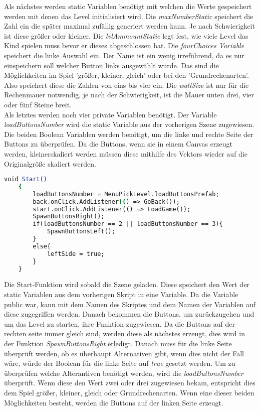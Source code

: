 Als nächstes werden static Variablen benötigt mit welchen die Werte gespeichert werden mit denen das Level initialisiert wird. Die \textit{maxNumberStatic} speichert die Zahl ein die später maximal zufällig generiert werden kann. Je nach Schwierigkeit ist diese größer oder kleiner. Die \textit{lvlAmmountStatic} legt fest, wie viele Level das Kind spielen muss bevor er dieses abgeschlossen hat. Die \textit{fourChoices Variable} speichert die linke Auswahl ein. Der Name ist ein wenig irreführend, da es nur einspeichern soll welcher Button links ausgewählt wurde. Das sind die Möglichkeiten im Spiel 'größer, kleiner, gleich' oder bei den 'Grundrechenarten'. Also speichert diese die Zahlen von eins bis vier ein. Die \textit{wallSize} ist nur für die Rechenmauer notwendig, je nach der Schwierigkeit, ist die Mauer unten drei, vier oder fünf Steine breit.\\
Als letztes werden noch vier private Variablen benötigt. Der Variable \textit{loadButtonsNumber} wird die static Variable aus der vorherigen Szene zugewiesen. Die beiden Boolean Variablen werden benötigt, um die linke und rechte Seite der Buttons zu überprüfen. Da die Buttons, wenn sie in einem Canvas erzeugt werden, kleinerskaliert werden müssen diese mithilfe des Vektors wieder auf die Originalgröße skaliert werden.\\
\begin{lstlisting}[language=csh, caption={MenuPickLevelAdvanced.cs Start-Funktion}]
	void Start()
	{
		loadButtonsNumber = MenuPickLevel.loadButtonsPrefab;
		back.onClick.AddListener(() => GoBack());
		start.onClick.AddListener(() => LoadGame());
		SpawnButtonsRight();
		if(loadButtonsNumber == 2 || loadButtonsNumber == 3){
			SpawnButtonsLeft();
		}
		else{
			leftSide = true;
		}
	}
\end{lstlisting}
Die Start-Funktion wird sobald die Szene geladen. Diese speichert den Wert der static Variablen aus dem vorherigen Skript in eine Variable. Da die Variable public war, kann mit dem Namen des Skriptes und dem Namen der Variablen auf diese zugegriffen werden.
Danach bekommen die Buttons, um zurückzugehen und um das Level zu starten, ihre Funktion zugewiesen. Da die Buttons auf der rechten seite immer gleich sind, werden diese als nächstes erzeugt, dies wird in der Funktion \textit{SpawnButtonsRight} erledigt. Danach muss für die linke Seite überprüft werden, ob es überhaupt Alternativen gibt, wenn dies nicht der Fall wäre, würde der Boolean für die linke Seite auf \textit{true} gesetzt werden. Um zu überprüfen welche Alterantiven benötigt werden, wird die \textit{loadButtonsNumber} überprüft. Wenn diese den Wert zwei oder drei zugewiesen bekam, entspricht dies dem Spiel  größer, kleiner, gleich oder Grundrechenarten. Wenn eine dieser beiden Möglichkeiten besteht, werden die Buttons auf der linken Seite erzeugt.\\
